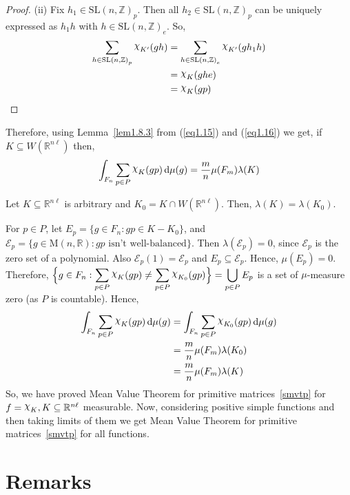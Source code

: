 \documentclass[11pt]{article}
\theoremstyle{definition}
\newcommand{\mychi}{\raisebox{2pt}{$\chi$}}
\begin{document}
\begin{proof}
    (ii) Fix $h_1 \in {\mathrm{SL}(n, \mathbb{Z})}_p$.
    Then all $h_2 \in {\mathrm{SL}(n, \mathbb{Z})}_p$ can be uniquely expressed as $h_1h$ with $h \in {\mathrm{SL}(n, \mathbb{Z})}_e$.
    So,
    \begin{align*}
        \displaystyle\sum_{h \in {\mathrm{SL}(n, \mathbb{Z})}_p} \mychi _{K'} (gh) &= \displaystyle\sum_{h \in {\mathrm{SL}(n, \mathbb{Z})}_e} \mychi _{K'}(gh_1h)\\
        &= \mychi _K (ghe)\\
        &= \mychi _K (gp)
    \end{align*}

\end{proof}

Therefore, using Lemma~\ref{lem1.8.3} from (\ref{eq1.15}) and (\ref{eq1.16}) we get, if $K \subseteq W(\mathbb{R}^{n \ell})$ then,
\[
    \int_{F_n} \displaystyle\sum_{p \in P} \mychi_{K} (gp) \, \mathrm{d} \mu (g) = \frac{m}{n} \mu (F_m) \lambda (K)
\]

Let $K \subseteq \mathbb{R}^{n \ell }$ is arbitrary and $K_0 = K \cap W(\mathbb{R}^{n\ell })$.
Then, $\lambda (K)= \lambda (K_0)$.

For $p \in P$, let  $E_p=\{g \in F_n : gp \in K-K_0\}$, and $\mathcal{E}_p= \{g \in \mathrm{M}(n, \mathbb{R}): gp \text{ isn't well-balanced}\}$.
Then $\lambda ( \mathcal{E}_p)=0$, since $\mathcal{E}_p$ is the zero set of a polynomial.
Also $\mathcal{E}_p(1) =\mathcal{E}_p$ and $E_p \subseteq \mathcal{E}_p$.
Hence, $\mu (E_p) = 0$.
Therefore, $\Big\{g \in F_n : \displaystyle\sum_{p \in P} \mychi _K(gp) \neq \displaystyle\sum_{p \in P}\mychi _{K_0} (gp)\Big\} = \bigcup _{p \in P}E_p$ is a set of $\mu$-measure zero (as $P$ is countable).
Hence,
\begin{align*}
    \int_{F_n} \displaystyle\sum_{p \in P} \mychi _K (gp) \, \mathrm{d} \mu (g)
    &=\int_{F_n} \displaystyle\sum_{p \in P} \mychi _{K_0} (gp) \, \mathrm{d} \mu (g) \\
    &= \frac{m}{n} \mu (F_m) \lambda (K_0) \\
    &= \frac{m}{n} \mu (F_m) \lambda (K)
\end{align*}
So, we have proved Mean Value Theorem for primitive matrices~\ref{smvtp} for $f= \mychi _K, K \subseteq \mathbb{R}^{n \ell }$ measurable.
Now, considering positive simple functions and then taking limits of them we get Mean Value Theorem for primitive matrices~\ref{smvtp} for all functions.

\section{Remarks}
\end{document}
